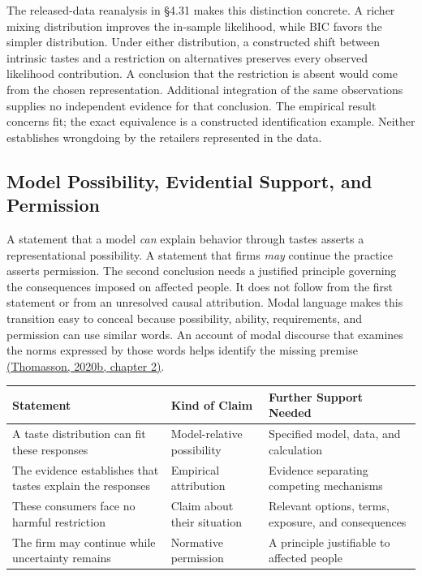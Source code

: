 The released-data reanalysis in §4.31 makes this distinction concrete. A
richer mixing distribution improves the in-sample likelihood, while BIC
favors the simpler distribution. Under either distribution, a
constructed shift between intrinsic tastes and a restriction on
alternatives preserves every observed likelihood contribution. A
conclusion that the restriction is absent would come from the chosen
representation. Additional integration of the same observations supplies
no independent evidence for that conclusion. The empirical result
concerns fit; the exact equivalence is a constructed identification
example. Neither establishes wrongdoing by the retailers represented in
the data.

\hypertarget{M09-model-possibility-evidential-support-and-permission}{%
\subsection{Model Possibility, Evidential Support, and
Permission}\label{M09-model-possibility-evidential-support-and-permission}}

\noindent \noindent A statement that a model \emph{can} explain behavior through
tastes asserts a representational possibility. A statement that firms
\emph{may} continue the practice asserts permission. The second
conclusion needs a justified principle governing the consequences
imposed on affected people. It does not follow from the first statement
or from an unresolved causal attribution. Modal language makes this
transition easy to conceal because possibility, ability, requirements,
and permission can use similar words. An account of modal discourse that
examines the norms expressed by those words helps identify the missing
premise
\href{https://academic.oup.com/book/33564/chapter-abstract/288025599}{(Thomasson,
2020b, chapter 2)}.

\begin{table}[H]
\centering\small
\begin{tabular}{@{}
  >{\raggedright\arraybackslash}p{}
  >{\raggedright\arraybackslash}p{}
  >{\raggedright\arraybackslash}p{}@{}}
\toprule
Statement & Kind of Claim & Further Support Needed \\
\midrule

A taste distribution can fit these responses & Model-relative
possibility & Specified model, data, and calculation \\
The evidence establishes that tastes explain the responses & Empirical
attribution & Evidence separating competing mechanisms \\
These consumers face no harmful restriction & Claim about their
situation & Relevant options, terms, exposure, and consequences \\
The firm may continue while uncertainty remains & Normative permission &
A principle justifiable to affected people \\
\bottomrule
\end{tabular}
\end{table}

